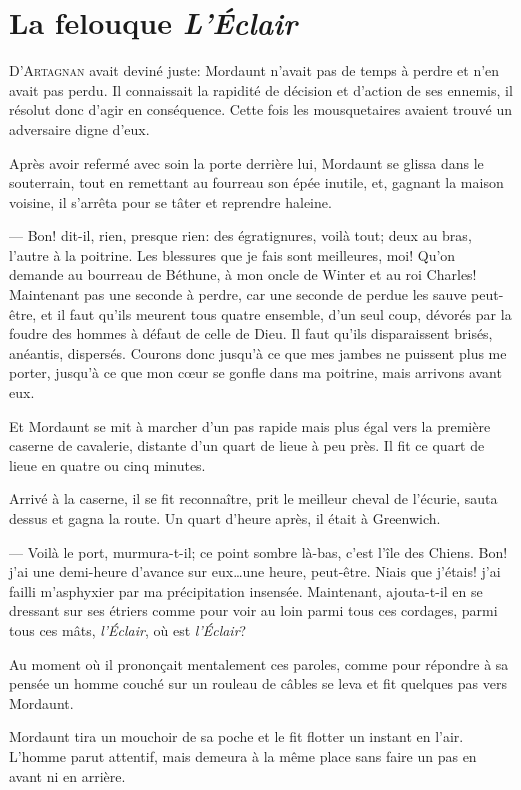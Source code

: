 \chapter{La felouque \emph{L'Éclair}}

\lettrine{D}{'Artagnan} avait deviné juste: Mordaunt n'avait pas de temps à perdre et n'en avait pas perdu. Il connaissait la rapidité de décision et d'action de ses ennemis, il résolut donc d'agir en conséquence. Cette fois les mousquetaires avaient trouvé un adversaire digne d'eux.

Après avoir refermé avec soin la porte derrière lui, Mordaunt se glissa dans le souterrain, tout en remettant au fourreau son épée inutile, et, gagnant la maison voisine, il s'arrêta pour se tâter et reprendre haleine.

— Bon! dit-il, rien, presque rien: des égratignures, voilà tout; deux au bras, l'autre à la poitrine. Les blessures que je fais sont meilleures, moi! Qu'on demande au bourreau de Béthune, à mon oncle de Winter et au roi Charles! Maintenant pas une seconde à perdre, car une seconde de perdue les sauve peut-être, et il faut qu'ils meurent tous quatre ensemble, d'un seul coup, dévorés par la foudre des hommes à défaut de celle de Dieu. Il faut qu'ils disparaissent brisés, anéantis, dispersés. Courons donc jusqu'à ce que mes jambes ne puissent plus me porter, jusqu'à ce que mon cœur se gonfle dans ma poitrine, mais arrivons avant eux.

Et Mordaunt se mit à marcher d'un pas rapide mais plus égal vers la première caserne de cavalerie, distante d'un quart de lieue à peu près. Il fit ce quart de lieue en quatre ou cinq minutes.

Arrivé à la caserne, il se fit reconnaître, prit le meilleur cheval de l'écurie, sauta dessus et gagna la route. Un quart d'heure après, il était à Greenwich.

— Voilà le port, murmura-t-il; ce point sombre là-bas, c'est l'île des Chiens. Bon! j'ai une demi-heure d'avance sur eux\dots une heure, peut-être. Niais que j'étais! j'ai failli m'asphyxier par ma précipitation insensée. Maintenant, ajouta-t-il en se dressant sur ses étriers comme pour voir au loin parmi tous ces cordages, parmi tous ces mâts, \textit{l'Éclair}, où est \textit{l'Éclair}?

Au moment où il prononçait mentalement ces paroles, comme pour répondre à sa pensée un homme couché sur un rouleau de câbles se leva et fit quelques pas vers Mordaunt.

Mordaunt tira un mouchoir de sa poche et le fit flotter un instant en l'air. L'homme parut attentif, mais demeura à la même place sans faire un pas en avant ni en arrière.

